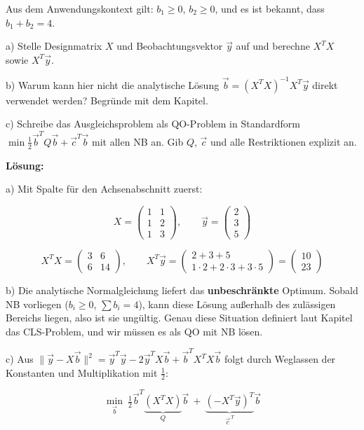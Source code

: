 \documentclass[11pt, a4paper]{article}
\begin{document}
Aus dem Anwendungskontext gilt: $b_1 \ge 0$, $b_2 \ge 0$, und es ist bekannt, dass $b_1 + b_2 = 4$.


a) Stelle Designmatrix $X$ und Beobachtungsvektor $\vec{y}$ auf und berechne $X^TX$ sowie $X^T\vec{y}$.

b) Warum kann hier nicht die analytische Lösung $\vec{b} = (X^TX)^{-1}X^T\vec{y}$ direkt verwendet werden? Begründe mit dem Kapitel.

c) Schreibe das Ausgleichsproblem als QO-Problem in Standardform $\min \tfrac{1}{2}\vec{b}^TQ\vec{b} + \vec{c}^T\vec{b}$ mit allen NB an. Gib $Q$, $\vec{c}$ und alle Restriktionen explizit an.


\textbf{Lösung:}


a) Mit Spalte für den Achsenabschnitt zuerst:


\[
X = \begin{pmatrix} 1 & 1 \\ 1 & 2 \\ 1 & 3 \end{pmatrix},\qquad \vec{y} = \begin{pmatrix} 2 \\ 3 \\ 5 \end{pmatrix}
\]


\[
X^TX = \begin{pmatrix} 3 & 6 \\ 6 & 14 \end{pmatrix}, \qquad X^T\vec{y} = \begin{pmatrix} 2+3+5 \\ 1\cdot 2 + 2\cdot 3 + 3\cdot 5 \end{pmatrix} = \begin{pmatrix} 10 \\ 23 \end{pmatrix}
\]


b) Die analytische Normalgleichung liefert das \textbf{unbeschränkte} Optimum. Sobald NB vorliegen ($b_i \ge 0$, $\sum b_i = 4$), kann diese Lösung außerhalb des zulässigen Bereichs liegen, also ist sie ungültig. Genau diese Situation definiert laut Kapitel das CLS-Problem, und wir müssen es als QO mit NB lösen.


c) Aus $\|\vec{y} - X\vec{b}\|^2 = \vec{y}^T\vec{y} - 2\vec{y}^TX\vec{b} + \vec{b}^TX^TX\vec{b}$ folgt durch Weglassen der Konstanten und Multiplikation mit $\tfrac{1}{2}$:


\[
\min_{\vec{b}}\ \tfrac{1}{2}\vec{b}^T\underbrace{(X^TX)}_{Q}\vec{b}\ +\ \underbrace{(-X^T\vec{y})^T}_{\vec{c}^{\,T}}\vec{b}
\]
\end{document}
